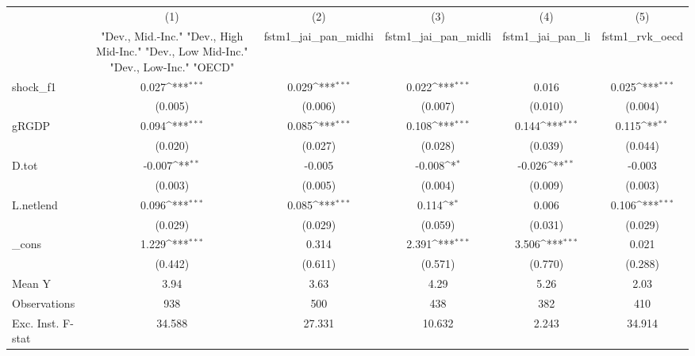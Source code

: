 {
\def\sym#1{\ifmmode^{#1}\else\(^{#1}\)\fi}
\begin{tabular}{l*{5}{c}}
\toprule
            &\multicolumn{1}{c}{(1)}&\multicolumn{1}{c}{(2)}&\multicolumn{1}{c}{(3)}&\multicolumn{1}{c}{(4)}&\multicolumn{1}{c}{(5)}\\
            &\multicolumn{1}{c}{ "Dev., Mid.-Inc." "Dev., High Mid-Inc." "Dev., Low Mid-Inc." "Dev., Low-Inc." "OECD" }&\multicolumn{1}{c}{fstm1\_jai\_pan\_midhi}&\multicolumn{1}{c}{fstm1\_jai\_pan\_midli}&\multicolumn{1}{c}{fstm1\_jai\_pan\_li}&\multicolumn{1}{c}{fstm1\_rvk\_oecd}\\
\midrule
shock\_f1    &       0.027\sym{***}&       0.029\sym{***}&       0.022\sym{***}&       0.016         &       0.025\sym{***}\\
            &     (0.005)         &     (0.006)         &     (0.007)         &     (0.010)         &     (0.004)         \\
\addlinespace
gRGDP       &       0.094\sym{***}&       0.085\sym{***}&       0.108\sym{***}&       0.144\sym{***}&       0.115\sym{**} \\
            &     (0.020)         &     (0.027)         &     (0.028)         &     (0.039)         &     (0.044)         \\
\addlinespace
D.tot       &      -0.007\sym{**} &      -0.005         &      -0.008\sym{*}  &      -0.026\sym{**} &      -0.003         \\
            &     (0.003)         &     (0.005)         &     (0.004)         &     (0.009)         &     (0.003)         \\
\addlinespace
L.netlend   &       0.096\sym{***}&       0.085\sym{***}&       0.114\sym{*}  &       0.006         &       0.106\sym{***}\\
            &     (0.029)         &     (0.029)         &     (0.059)         &     (0.031)         &     (0.029)         \\
\addlinespace
\_cons      &       1.229\sym{***}&       0.314         &       2.391\sym{***}&       3.506\sym{***}&       0.021         \\
            &     (0.442)         &     (0.611)         &     (0.571)         &     (0.770)         &     (0.288)         \\
\midrule
Mean Y      &        3.94         &        3.63         &        4.29         &        5.26         &        2.03         \\
Observations&         938         &         500         &         438         &         382         &         410         \\
Exc. Inst. F-stat&      34.588         &      27.331         &      10.632         &       2.243         &      34.914         \\
\bottomrule
\end{tabular}
}
